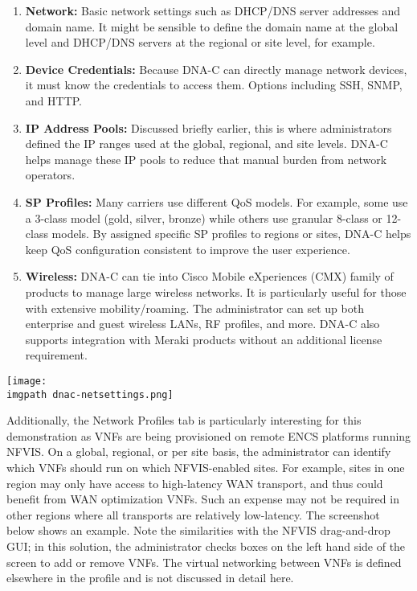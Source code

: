 \begin{enumerate}
  \item \textbf{Network:} Basic network settings such as DHCP/DNS server
  addresses and domain name. It might be sensible to define the domain name at
  the global level and DHCP/DNS servers at the regional or site level, for example.
  \item \textbf{Device Credentials:} Because DNA-C can directly manage network
  devices, it must know the credentials to access them. Options including SSH,
  SNMP, and HTTP.
  \item \textbf{IP Address Pools:} Discussed briefly earlier, this is where
  administrators defined the IP ranges used at the global, regional, and site
  levels. DNA-C helps manage these IP pools to reduce that manual burden from
  network operators.
  \item \textbf{SP Profiles:} Many carriers use different QoS models. For
  example, some use a 3-class model (gold, silver, bronze) while others use
  granular 8-class or 12-class models. By assigned specific SP profiles to
  regions or sites, DNA-C helps keep QoS configuration consistent to improve
  the user experience.
  \item \textbf{Wireless:} DNA-C can tie into Cisco Mobile eXperiences (CMX)
  family of products to manage large wireless networks. It is particularly
  useful for those with extensive mobility/roaming. The administrator can set
  up both enterprise and guest wireless LANs, RF profiles, and more. DNA-C
  also supports integration with Meraki products without an additional license requirement.
\end{enumerate}

    \begin{minipage}[t]{\linewidth}
	  \centering
      \texttt{[image: \\imgpath dnac-netsettings.png]}
    \end{minipage}

Additionally, the Network Profiles tab is particularly interesting for this
demonstration as VNFs are being provisioned on remote ENCS platforms running
NFVIS. On a global, regional, or per site basis, the administrator can
identify which VNFs should run on which NFVIS-enabled sites. For example,
sites in one region may only have access to high-latency WAN transport, and
thus could benefit from WAN optimization VNFs. Such an expense may not be
required in other regions where all transports are relatively low-latency. The
screenshot below shows an example. Note the similarities with the NFVIS
drag-and-drop GUI; in this solution, the administrator checks boxes on the
left hand side of the screen to add or remove VNFs. The virtual networking
between VNFs is defined elsewhere in the profile and is not discussed in
detail here.

